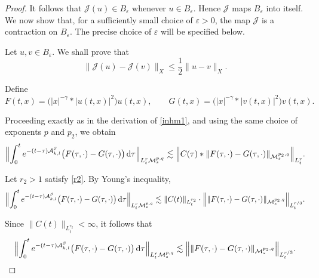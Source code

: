 \documentclass[12pt,reqno,a4paper]{amsart}
\numberwithin{equation}{section}
\theoremstyle{plain}
\theoremstyle{definition}
\theoremstyle{remark}
\def\M{\mathcal{M}}
\def \Ad{\mathcal{A}_{k,l}}
\def \M{{\mathcal M}}
\begin{document}
\begin{proof}
It follows that \(\mathcal{J}(u)\in B_{\varepsilon}\) whenever \(u\in B_{\varepsilon}\). Hence \(\mathcal{J}\) maps \(B_{\varepsilon}\) into itself. 
{We now show that, for a sufficiently small choice of $\varepsilon>0$, the map $\mathcal{J}$ is a contraction on $B_{\varepsilon}$. The precise choice of $\varepsilon$ will be specified below.}

Let $u,v\in B_{\varepsilon}$. We shall prove that
\[
\|\mathcal{J}(u)-\mathcal{J}(v)\|_{X}
\leq
\frac{1}{2}\|u-v\|_{X}.
\]

Define
\[
F(t,x)
=
\bigl(|x|^{-\gamma}*|u(t,x)|^{2}\bigr)u(t,x),
\qquad
G(t,x)
=
\bigl(|x|^{-\gamma}*|v(t,x)|^{2}\bigr)v(t,x).
\]

Proceeding exactly as in the derivation of \eqref{inhm1}, and using the same choice of exponents $p$ and $p_{2}$, we obtain
\begin{align*}
\Bigl\|
\int_{0}^{t}
e^{-(t-\tau)\Ad^{\beta}}
\bigl(F(\tau,\cdot)-G(\tau,\cdot)\bigr)
\,\mathrm{d}\tau
\Bigr\|_{L^{r}_{t}\M^{p,q}_{s}}
\lesssim
\Bigl\|
C(\tau)
*
\|F(\tau,\cdot)-G(\tau,\cdot)\|_{\M^{p_{2},q}_{s}}
\Bigr\|_{L^{r}_{t}}.
\end{align*}

Let $r_{2}>1$ satisfy \eqref{r2}. By Young's inequality,
\begin{align*}
\Bigl\|
\int_{0}^{t}
e^{-(t-\tau)\Ad^{\beta}}
\bigl(F(\tau,\cdot)-G(\tau,\cdot)\bigr)
\,\mathrm{d}\tau
\Bigr\|_{L^{r}_{t}\M^{p,q}_{s}}
\lesssim
\|C(t)\|_{L^{r_{2}}_{t}}
\cdot
\Bigl\|
\|F(\tau,\cdot)-G(\tau,\cdot)\|_{\M^{p_{2},q}_{s}}
\Bigr\|_{L^{r/3}_{t}}.
\end{align*}

Since $\|C(t)\|_{L^{r_{2}}_{t}}<\infty$, it follows that
\begin{align}
\label{trlnr1}
\Bigl\|
\int_{0}^{t}
e^{-(t-\tau)\Ad^{\beta}}
\bigl(F(\tau,\cdot)-G(\tau,\cdot)\bigr)
\,\mathrm{d}\tau
\Bigr\|_{L^{r}_{t}\M^{p,q}_{s}}
\lesssim
\Bigl\|
\|F(\tau,\cdot)-G(\tau,\cdot)\|_{\M^{p_{2},q}_{s}}
\Bigr\|_{L^{r/3}_{t}}.
\end{align}


\end{proof}
\end{document}
